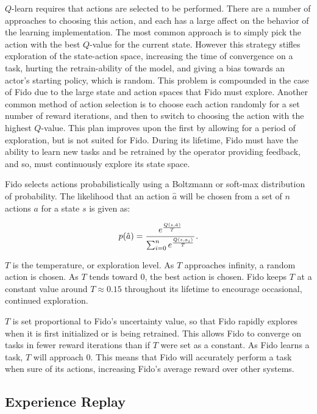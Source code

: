 $Q$-learn requires that actions are selected to be performed.
There are a number of approaches to choosing this action, and each has a large affect on the behavior of the learning implementation.
The most common approach is to simply pick the action with the best $Q$-value for the current state.
However this strategy stifles exploration of the state-action space, increasing the time of convergence on a task, hurting the retrain-ability of the model, and giving a bias towards an actor's starting policy, which is random.
This problem is compounded in the case of Fido due to the large state and action spaces that Fido must explore.
Another common method of action selection is to choose each action randomly for a set number of reward iterations, and then to switch to choosing the action with the highest $Q$-value.
This plan improves upon the first by allowing for a period of exploration, but is not suited for Fido.
During its lifetime, Fido must have the ability to learn new tasks and be retrained by the operator providing feedback, and so, must continuously explore its state space.

Fido selects actions probabilistically using a Boltzmann or soft-max distribution of probability.
The likelihood that an action $\hat{a}$ will be chosen from a set of $n$ actions $a$ for a state $s$ is given as:

\begin{equation}
	p(\hat{a}) = \cfrac{e^{\frac{Q(s, \hat{a})}{T}}}{\sum_{i=0}^{n}e^{\frac{Q(s, a_i)}{T}}}
	\,.
	\label{equ::boltzmann}
\end{equation}

$T$ is the temperature, or exploration level.
As $T$ approaches infinity, a random action is chosen.
As $T$ tends toward 0, the best action is chosen.
Fido keeps $T$ at a constant value around $T \approx 0.15$ throughout its lifetime to encourage occasional, continued exploration.

$T$ is set proportional to Fido's uncertainty value, so that Fido rapidly explores when it is first initialized or is being retrained. This allows Fido to converge on tasks in fewer reward iterations than if $T$ were set as a constant. As Fido learns a task, $T$ will approach 0. This means that Fido will accurately perform a task when sure of its actions, increasing Fido's average reward over other systems.

\subsection{Experience Replay}

